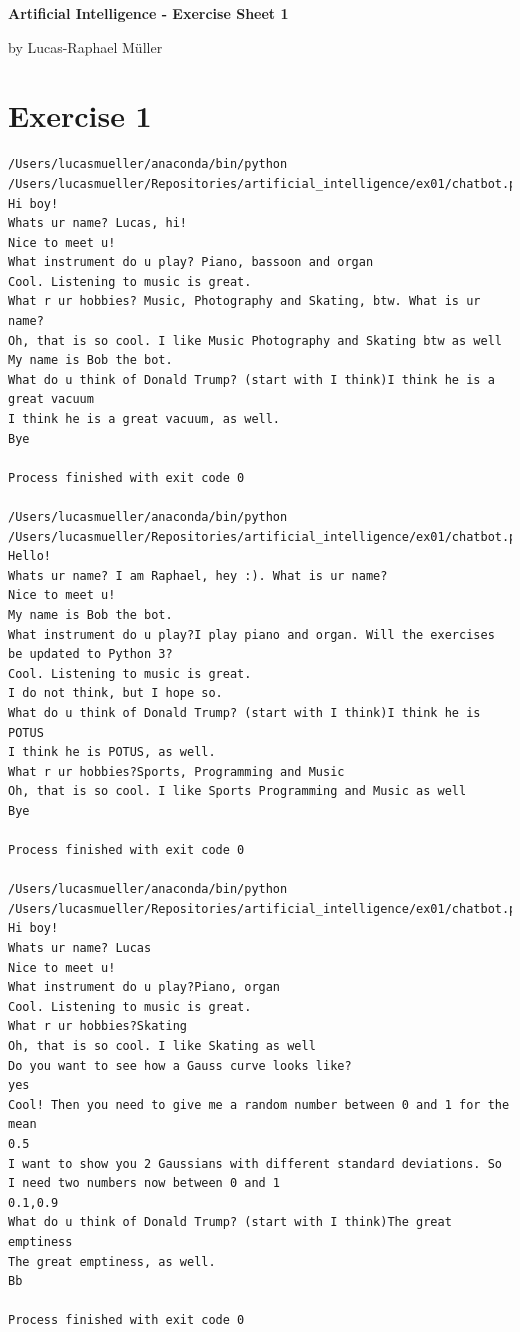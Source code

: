 \documentclass[11pt,a4paper,twoside]{article}
\begin{document}
\renewcommand\thesubsection{\alph{subsection})}

\lstset {
language = bash,
	breaklines = true,
	breakatwhitespace = true
}

\centerline{\LARGE \textbf{Artificial Intelligence - Exercise Sheet 1}}\vspace{0.5em}
\centerline{\large by Lucas-Raphael Müller}\vspace{2em}

\section*{Exercise 1}
\begin{lstlisting}
/Users/lucasmueller/anaconda/bin/python /Users/lucasmueller/Repositories/artificial_intelligence/ex01/chatbot.py
Hi boy!
Whats ur name? Lucas, hi!
Nice to meet u!
What instrument do u play? Piano, bassoon and organ
Cool. Listening to music is great.
What r ur hobbies? Music, Photography and Skating, btw. What is ur name?
Oh, that is so cool. I like Music Photography and Skating btw as well
My name is Bob the bot.
What do u think of Donald Trump? (start with I think)I think he is a great vacuum
I think he is a great vacuum, as well.
Bye

Process finished with exit code 0

/Users/lucasmueller/anaconda/bin/python /Users/lucasmueller/Repositories/artificial_intelligence/ex01/chatbot.py
Hello!
Whats ur name? I am Raphael, hey :). What is ur name?
Nice to meet u!
My name is Bob the bot.
What instrument do u play?I play piano and organ. Will the exercises be updated to Python 3?
Cool. Listening to music is great.
I do not think, but I hope so.
What do u think of Donald Trump? (start with I think)I think he is POTUS
I think he is POTUS, as well.
What r ur hobbies?Sports, Programming and Music
Oh, that is so cool. I like Sports Programming and Music as well
Bye

Process finished with exit code 0

/Users/lucasmueller/anaconda/bin/python /Users/lucasmueller/Repositories/artificial_intelligence/ex01/chatbot.py
Hi boy!
Whats ur name? Lucas
Nice to meet u!
What instrument do u play?Piano, organ
Cool. Listening to music is great.
What r ur hobbies?Skating
Oh, that is so cool. I like Skating as well
Do you want to see how a Gauss curve looks like? 
yes
Cool! Then you need to give me a random number between 0 and 1 for the mean 
0.5
I want to show you 2 Gaussians with different standard deviations. So I need two numbers now between 0 and 1 
0.1,0.9
What do u think of Donald Trump? (start with I think)The great emptiness
The great emptiness, as well.
Bb

Process finished with exit code 0
\end{lstlisting}
\end{document}
